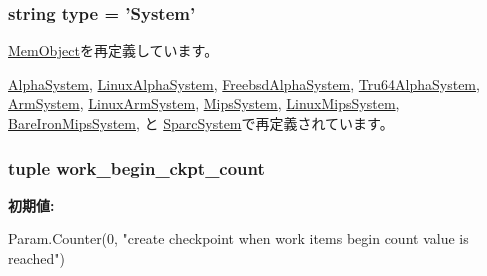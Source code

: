 \label{classSystem_1_1System_ac1b872638c5b453dbc59423eb0e07188}
\hypertarget{classSystem_1_1System_acce15679d830831b0bbe8ebc2a60b2ca}{
\subsubsection[{type}]{\setlength{\rightskip}{0pt plus 5cm}string {\bf type} = '{\bf System}'}}
\label{classSystem_1_1System_acce15679d830831b0bbe8ebc2a60b2ca}


\hyperlink{classMemObject_1_1MemObject_acce15679d830831b0bbe8ebc2a60b2ca}{MemObject}を再定義しています。

\hyperlink{classAlphaSystem_1_1AlphaSystem_acce15679d830831b0bbe8ebc2a60b2ca}{AlphaSystem}, \hyperlink{classAlphaSystem_1_1LinuxAlphaSystem_acce15679d830831b0bbe8ebc2a60b2ca}{LinuxAlphaSystem}, \hyperlink{classAlphaSystem_1_1FreebsdAlphaSystem_acce15679d830831b0bbe8ebc2a60b2ca}{FreebsdAlphaSystem}, \hyperlink{classAlphaSystem_1_1Tru64AlphaSystem_acce15679d830831b0bbe8ebc2a60b2ca}{Tru64AlphaSystem}, \hyperlink{classArmSystem_1_1ArmSystem_acce15679d830831b0bbe8ebc2a60b2ca}{ArmSystem}, \hyperlink{classArmSystem_1_1LinuxArmSystem_acce15679d830831b0bbe8ebc2a60b2ca}{LinuxArmSystem}, \hyperlink{classMipsSystem_1_1MipsSystem_acce15679d830831b0bbe8ebc2a60b2ca}{MipsSystem}, \hyperlink{classMipsSystem_1_1LinuxMipsSystem_acce15679d830831b0bbe8ebc2a60b2ca}{LinuxMipsSystem}, \hyperlink{classMipsSystem_1_1BareIronMipsSystem_acce15679d830831b0bbe8ebc2a60b2ca}{BareIronMipsSystem}, と \hyperlink{classSparcSystem_1_1SparcSystem_acce15679d830831b0bbe8ebc2a60b2ca}{SparcSystem}で再定義されています。\hypertarget{classSystem_1_1System_a4c6744a2f66abf58ecfc3034831c2414}{
\subsubsection[{work\_\-begin\_\-ckpt\_\-count}]{\setlength{\rightskip}{0pt plus 5cm}tuple {\bf work\_\-begin\_\-ckpt\_\-count}}}
\label{classSystem_1_1System_a4c6744a2f66abf58ecfc3034831c2414}
{\bfseries 初期値:}
\begin{DoxyCode}
Param.Counter(0,
        "create checkpoint when work items begin count value is reached")
\end{DoxyCode}
